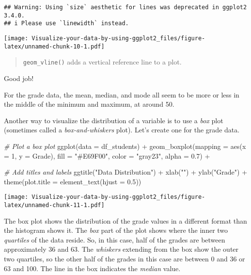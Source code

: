 \documentclass[
]{article}
\newenvironment{Shaded}{\begin{snugshade}}{\end{snugshade}}
\newcommand{\AttributeTok}[1]{\textcolor[rgb]{0.77,0.63,0.00}{#1}}
\newcommand{\CommentTok}[1]{\textcolor[rgb]{0.56,0.35,0.01}{\textit{#1}}}
\newcommand{\DecValTok}[1]{\textcolor[rgb]{0.00,0.00,0.81}{#1}}
\newcommand{\FloatTok}[1]{\textcolor[rgb]{0.00,0.00,0.81}{#1}}
\newcommand{\FunctionTok}[1]{\textcolor[rgb]{0.00,0.00,0.00}{#1}}
\newcommand{\NormalTok}[1]{#1}
\newcommand{\SpecialCharTok}[1]{\textcolor[rgb]{0.00,0.00,0.00}{#1}}
\newcommand{\StringTok}[1]{\textcolor[rgb]{0.31,0.60,0.02}{#1}}
\begin{document}
\begin{verbatim}
## Warning: Using `size` aesthetic for lines was deprecated in ggplot2 3.4.0.
## i Please use `linewidth` instead.
\end{verbatim}

\texttt{[image: Visualize-your-data-by-using-ggplot2\_files/figure-latex/unnamed-chunk-10-1.pdf]}

\begin{quote}
\texttt{geom\_vline()} adds a vertical reference line to a plot.
\end{quote}

Good job!

For the grade data, the mean, median, and mode all seem to be more or
less in the middle of the minimum and maximum, at around 50.

Another way to visualize the distribution of a variable is to use a
\emph{box} plot (sometimes called a \emph{box-and-whiskers} plot). Let's
create one for the grade data.

\begin{Shaded}
\begin{Highlighting}[]
\CommentTok{\# Plot a box plot}
\FunctionTok{ggplot}\NormalTok{(}\AttributeTok{data =}\NormalTok{ df\_students) }\SpecialCharTok{+}
  \FunctionTok{geom\_boxplot}\NormalTok{(}\AttributeTok{mapping =} \FunctionTok{aes}\NormalTok{(}\AttributeTok{x =} \DecValTok{1}\NormalTok{, }\AttributeTok{y =}\NormalTok{ Grade), }\AttributeTok{fill =} \StringTok{"\#E69F00"}\NormalTok{, }\AttributeTok{color =} \StringTok{"gray23"}\NormalTok{, }\AttributeTok{alpha =} \FloatTok{0.7}\NormalTok{) }\SpecialCharTok{+}
  
  \CommentTok{\# Add titles and labels}
  \FunctionTok{ggtitle}\NormalTok{(}\StringTok{"Data Distribution"}\NormalTok{) }\SpecialCharTok{+}
  \FunctionTok{xlab}\NormalTok{(}\StringTok{""}\NormalTok{) }\SpecialCharTok{+}
  \FunctionTok{ylab}\NormalTok{(}\StringTok{"Grade"}\NormalTok{) }\SpecialCharTok{+}
  \FunctionTok{theme}\NormalTok{(}\AttributeTok{plot.title =} \FunctionTok{element\_text}\NormalTok{(}\AttributeTok{hjust =} \FloatTok{0.5}\NormalTok{))}
\end{Highlighting}
\end{Shaded}

\texttt{[image: Visualize-your-data-by-using-ggplot2\_files/figure-latex/unnamed-chunk-11-1.pdf]}

The box plot shows the distribution of the grade values in a different
format than the histogram shows it. The \emph{box} part of the plot
shows where the inner two \emph{quartiles} of the data reside. So, in
this case, half of the grades are between approximately 36 and 63. The
\emph{whiskers} extending from the box show the outer two quartiles, so
the other half of the grades in this case are between 0 and 36 or 63 and
100. The line in the box indicates the \emph{median} value.
\end{document}
